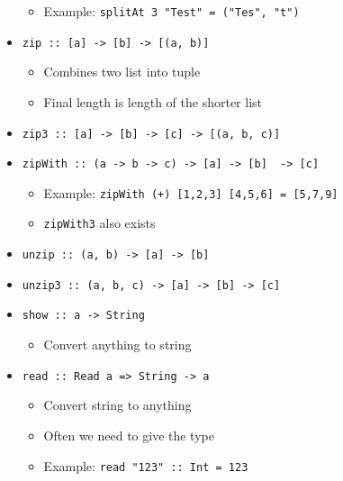 \begin{itemize}
\begin{itemize}
            \item Example: \verb+splitAt 3 "Test" = ("Tes", "t")+
        \end{itemize}
    \item \verb+zip :: [a] -> [b] -> [(a, b)]+
        \begin{itemize}
            \item Combines two list into tuple
            \item Final length is length of the shorter list
        \end{itemize}
    \item \verb+zip3 :: [a] -> [b] -> [c] -> [(a, b, c)]+
    \item \verb+zipWith :: (a -> b -> c) -> [a] -> [b]  -> [c]+
        \begin{itemize}
            \item Example: \verb|zipWith (+) [1,2,3] [4,5,6] = [5,7,9]|
            \item \verb+zipWith3+ also exists
        \end{itemize}
    \item \verb+unzip :: (a, b) -> [a] -> [b]+
    \item \verb+unzip3 :: (a, b, c) -> [a] -> [b] -> [c]+
    \item \verb+show :: a -> String+
        \begin{itemize}
            \item Convert anything to string
        \end{itemize}
    \item \verb+read :: Read a => String -> a+
        \begin{itemize}
            \item Convert string to anything
            \item Often we need to give the type
            \item Example: \verb+read "123" :: Int = 123+
        \end{itemize}
\end{itemize}
